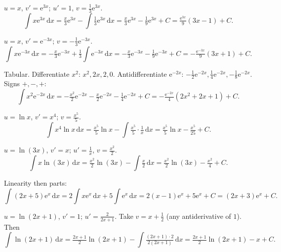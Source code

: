 \begin{solutions}
  \item $u=x$, $v'=\mathrm{e}^{3x}$; $u'=1$, $v=\tfrac13\mathrm{e}^{3x}$.
        \[
          \int x\mathrm{e}^{3x}\,\mathrm{d}x
            = \tfrac{x}{3}\mathrm{e}^{3x}-\int \tfrac13\mathrm{e}^{3x}\,\mathrm{d}x
            = \tfrac{x}{3}\mathrm{e}^{3x}-\tfrac19\mathrm{e}^{3x}+C
            = \tfrac{\mathrm{e}^{3x}}{9}(3x-1)+C .
        \]

  \item $u=x$, $v'=\mathrm{e}^{-3x}$; $v=-\tfrac13\mathrm{e}^{-3x}$.
        \[
          \int x\mathrm{e}^{-3x}\,\mathrm{d}x
            = -\tfrac{x}{3}\mathrm{e}^{-3x}+\tfrac13\int \mathrm{e}^{-3x}\,\mathrm{d}x
            = -\tfrac{x}{3}\mathrm{e}^{-3x}-\tfrac19\mathrm{e}^{-3x}+C
            = -\tfrac{\mathrm{e}^{-3x}}{9}(3x+1)+C .
        \]

  \item Tabular. Differentiate $x^{2}$: $x^{2},2x,2,0$. Antidifferentiate
        $\mathrm{e}^{-2x}$: $-\tfrac12\mathrm{e}^{-2x},\tfrac14\mathrm{e}^{-2x},
        -\tfrac18\mathrm{e}^{-2x}$. Signs $+,-,+$:
        \[
          \int x^{2}\mathrm{e}^{-2x}\,\mathrm{d}x
            = -\tfrac{x^{2}}{2}\mathrm{e}^{-2x}-\tfrac{x}{2}\mathrm{e}^{-2x}
              -\tfrac14\mathrm{e}^{-2x}+C
            = -\tfrac{\mathrm{e}^{-2x}}{4}(2x^{2}+2x+1)+C .
        \]

  \item $u=\ln x$, $v'=x^{4}$; $v=\tfrac{x^{5}}{5}$.
        \[
          \int x^{4}\ln x\,\mathrm{d}x
            = \tfrac{x^{5}}{5}\ln x - \int \tfrac{x^{5}}{5}\cdot\tfrac1x\,\mathrm{d}x
            = \tfrac{x^{5}}{5}\ln x - \tfrac{x^{5}}{25}+C .
        \]

  \item $u=\ln(3x)$, $v'=x$; $u'=\tfrac1x$, $v=\tfrac{x^{2}}{2}$.
        \[
          \int x\ln(3x)\,\mathrm{d}x
            = \tfrac{x^{2}}{2}\ln(3x)-\int \tfrac{x}{2}\,\mathrm{d}x
            = \tfrac{x^{2}}{2}\ln(3x)-\tfrac{x^{2}}{4}+C .
        \]

  \item Linearity then parts:
        \[
          \int (2x+5)\mathrm{e}^{x}\,\mathrm{d}x
            = 2\int x\mathrm{e}^{x}\,\mathrm{d}x + 5\int \mathrm{e}^{x}\,\mathrm{d}x
            = 2(x-1)\mathrm{e}^{x}+5\mathrm{e}^{x}+C
            = (2x+3)\mathrm{e}^{x}+C .
        \]

  \item $u=\ln(2x+1)$, $v'=1$; $u'=\tfrac{2}{2x+1}$. Take $v=x+\tfrac12$
        (any antiderivative of $1$). Then
        \[
          \int \ln(2x+1)\,\mathrm{d}x
            = \tfrac{2x+1}{2}\ln(2x+1)-\int \tfrac{(2x+1)\cdot 2}{2(2x+1)}\,\mathrm{d}x
            = \tfrac{2x+1}{2}\ln(2x+1)-x+C .
        \]


\end{solutions}
